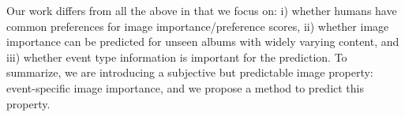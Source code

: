 \documentclass[10pt,twocolumn,letterpaper]{article}
\begin{document}


Our work differs from all the above in that we focus on: i) whether humans have common preferences for image importance/preference scores, ii) whether image importance can be predicted for unseen albums with widely varying content, and iii) whether event type information is important for the prediction. To summarize, we are introducing a subjective but predictable image property: event-specific image importance, and we propose a method to predict this property.
\end{document}
